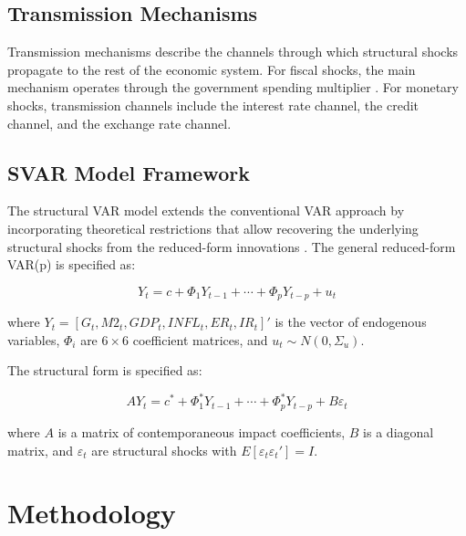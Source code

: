 \documentclass[12pt, a4paper]{article}
\begin{document}
\subsection{Transmission Mechanisms}

Transmission mechanisms describe the channels through which structural shocks propagate to the rest of the economic system. For fiscal shocks, the main mechanism operates through the government spending multiplier \citep{blanchard2002, fatas2001, auerbach2012, ramey2011, hall2009}. For monetary shocks, transmission channels include the interest rate channel, the credit channel, and the exchange rate channel.

\subsection{SVAR Model Framework}

The structural VAR model extends the conventional VAR approach by incorporating theoretical restrictions that allow recovering the underlying structural shocks from the reduced-form innovations \citep{sims1980, bernanke1986, blanchardwatson1986, christiano1999, kilian2017}. The general reduced-form VAR(p) is specified as:

\begin{equation}
Y_t = c + \Phi_1 Y_{t-1} + \cdots + \Phi_p Y_{t-p} + u_t
\label{eq:var}
\end{equation}

where $Y_t = [G_t, M2_t, GDP_t, INFL_t, ER_t, IR_t]'$ is the vector of endogenous variables, $\Phi_i$ are $6 \times 6$ coefficient matrices, and $u_t \sim N(0, \Sigma_u)$.

The structural form is specified as:

\begin{equation}
A Y_t = c^* + \Phi_1^* Y_{t-1} + \cdots + \Phi_p^* Y_{t-p} + B \varepsilon_t
\label{eq:svar}
\end{equation}

where $A$ is a matrix of contemporaneous impact coefficients, $B$ is a diagonal matrix, and $\varepsilon_t$ are structural shocks with $E[\varepsilon_t \varepsilon_t'] = I$.

\section{Methodology}
\end{document}
